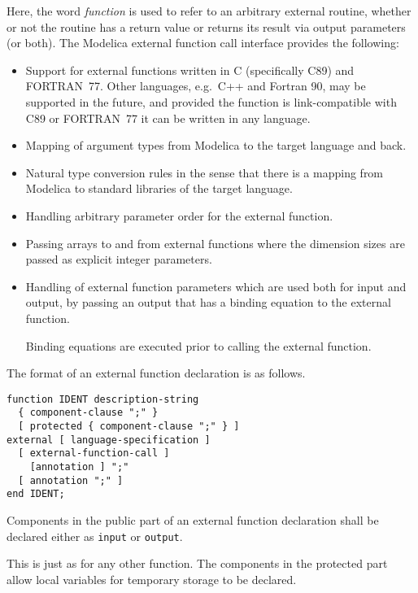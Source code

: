 Here, the word \emph{function} is used to refer to an arbitrary external routine, whether or not the routine has a return value or returns its result via output parameters (or both).
The Modelica external function call interface provides the following:
\begin{itemize}
\item
  Support for external functions written in C (specifically C89) and
  FORTRAN~77. Other languages, e.g.\ C++ and Fortran 90, may be supported
  in the future, and provided the function is link-compatible with C89
  or FORTRAN~77 it can be written in any language.
\item
  Mapping of argument types from Modelica to the target language and
  back.
\item
  Natural type conversion rules in the sense that there is a mapping
  from Modelica to standard libraries of the target language.
\item
  Handling arbitrary parameter order for the external function.
\item
  Passing arrays to and from external functions where the dimension
  sizes are passed as explicit integer parameters.
\item
  Handling of external function parameters which are used both for input
  and output, by passing an output that has a binding equation to
  the external function.
  \begin{nonnormative}
  Binding equations are executed prior to calling the external function.
  \end{nonnormative}
\end{itemize}

The format of an external function declaration is as follows.
\begin{lstlisting}[language=grammar]
function IDENT description-string
  { component-clause ";" }
  [ protected { component-clause ";" } ]
external [ language-specification ]
  [ external-function-call ]
    [annotation ] ";"
  [ annotation ";" ]
end IDENT;
\end{lstlisting}

Components in the public part of an external function declaration shall be declared either as \lstinline!input! or \lstinline!output!.

\begin{nonnormative}
This is just as for any other function.  The components in the protected part allow local variables for temporary storage to be declared.
\end{nonnormative}

